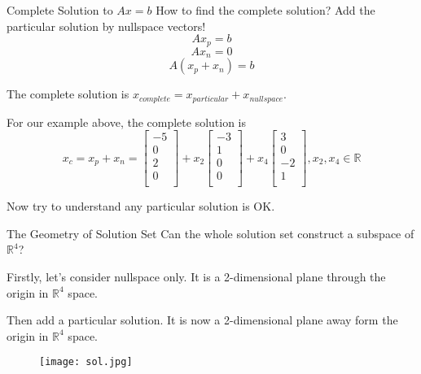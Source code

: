 \documentclass{beamer}
\begin{document}
\begin{frame}{Complete Solution to $Ax=b$}
How to find the complete solution? Add the particular solution by nullspace vectors!
\begin{equation*}
    Ax_p=b
\end{equation*}
\begin{equation*}
    Ax_n=0
\end{equation*}
\begin{equation*}
    A(x_p+x_n)=b
\end{equation*}

The complete solution is $x_{complete}=x_{particular}+x_{nullspace}$.

\vspace{3pt}
For our example above, the complete solution is
\begin{equation*}
    x_c=x_p+x_n=\left[ \begin{array}{c}
        -5\\
        0\\
        2\\
        0\\
    \end{array} \right] +x_2\left[ \begin{array}{c}
        -3\\
        1\\
        0\\
        0\\
    \end{array} \right] +x_4\left[ \begin{array}{c}
        3\\
        0\\
        -2\\
        1\\
    \end{array} \right], x_2, x_4 \in \mathbb{R}
\end{equation*}

Now try to understand any particular solution is OK.
\end{frame}

\begin{frame}{The Geometry of Solution Set}
Can the whole solution set construct a subspace of $\mathbb{R}^4$?

\vspace{3pt}
Firstly, let's consider nullspace only. It is a 2-dimensional plane through the origin in $\mathbb{R}^4$ space.

\vspace{3pt}
Then add a particular solution.  It is now a 2-dimensional plane away form the origin in $\mathbb{R}^4$ space.

\begin{figure}
    \centering
    \texttt{[image: sol.jpg]}
\end{figure}

\end{frame}
\end{document}
